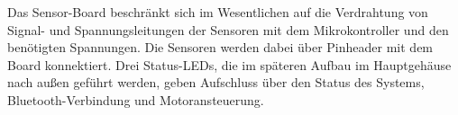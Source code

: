 Das Sensor-Board beschränkt sich im Wesentlichen auf die Verdrahtung von Signal- und Spannungsleitungen der Sensoren mit dem Mikrokontroller und den benötigten Spannungen. Die Sensoren werden dabei über Pinheader mit dem Board konnektiert. Drei Status-LEDs, die im späteren Aufbau im Hauptgehäuse nach außen geführt werden, geben Aufschluss über den Status des Systems, Bluetooth-Verbindung und Motoransteuerung.







